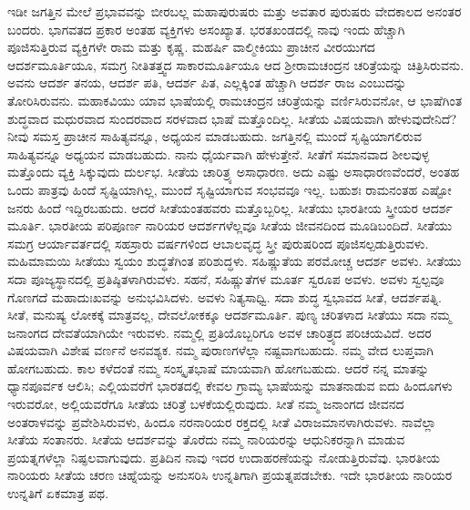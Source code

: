 ಇಡೀ ಜಗತ್ತಿನ ಮೇಲೆ ಪ್ರಭಾವವನ್ನು ಬೀರಬಲ್ಲ ಮಹಾಪುರುಷರು ಮತ್ತು ಅವತಾರ ಪುರುಷರು ವೇದಕಾಲದ ಅನಂತರ ಬಂದರು. ಭಾಗವತದ ಪ್ರಕಾರ ಅಂತಹ ವ್ಯಕ್ತಿಗಳು ಅಸಂಖ್ಯಾತ. ಭರತಖಂಡದಲ್ಲಿ ನಾವು ಇಂದು ಹೆಚ್ಚಾಗಿ ಪೂಜಿಸುತ್ತಿರುವ ವ್ಯಕ್ತಿಗಳೇ ರಾಮ ಮತ್ತು ಕೃಷ್ಣ. ಮಹರ್ಷಿ ವಾಲ್ಮೀಕಿಯು ಪ್ರಾಚೀನ ವೀರಯುಗದ ಆದರ್ಶಮೂರ್ತಿಯೂ, ಸಮಗ್ರ ನೀತಿತತ್ತ್ವದ ಸಾಕಾರಮೂರ್ತಿಯೂ ಆದ ಶ‍್ರೀರಾಮಚಂದ್ರನ ಚರಿತ್ರೆಯನ್ನು ಚಿತ್ರಿಸಿರುವನು. ಅವನು ಆದರ್ಶ ತನಯ, ಆದರ್ಶ ಪತಿ, ಆದರ್ಶ ಪಿತ, ಎಲ್ಲಕ್ಕಿಂತ ಹೆಚ್ಚಾಗಿ ಆದರ್ಶ ರಾಜ ಎಂಬುದನ್ನು ತೋರಿಸಿರುವನು. ಮಹಾಕವಿಯು ಯಾವ ಭಾಷೆಯಲ್ಲಿ ರಾಮಚಂದ್ರನ ಚರಿತ್ರೆಯನ್ನು ವರ್ಣಿಸಿರುವನೋ, ಆ ಭಾಷೆಗಿಂತ ಶುದ್ಧವಾದ ಮಧುರವಾದ ಸುಂದರವಾದ ಸರಳವಾದ ಭಾಷೆ ಮತ್ತೊಂದಿಲ್ಲ. ಸೀತೆಯ ವಿಷಯವಾಗಿ ಹೇಳುವುದೇನಿದೆ? ನೀವು ಸಮಸ್ತ ಪ್ರಾಚೀನ ಸಾಹಿತ್ಯವನ್ನೂ, ಅಧ್ಯಯನ ಮಾಡಬಹುದು. ಜಗತ್ತಿನಲ್ಲಿ ಮುಂದೆ ಸೃಷ್ಟಿಯಾಗಲಿರುವ ಸಾಹಿತ್ಯವನ್ನೂ ಅಧ್ಯಯನ ಮಾಡಬಹುದು. ನಾನು ಧೈರ್ಯವಾಗಿ ಹೇಳುತ್ತೇನೆ. ಸೀತೆಗೆ ಸಮಾನವಾದ ಶೀಲವುಳ್ಳ ಮತ್ತೊಂದು ವ್ಯಕ್ತಿ ಸಿಕ್ಕುವುದು ದುರ್ಲಭ. ಸೀತೆಯ ಚಾರಿತ್ರ್ಯ ಅಸಾಧಾರಣ. ಅದು ಎಷ್ಟು ಅಸಾಧಾರಣವೆಂದರೆ, ಅಂತಹ ಒಂದು ಪಾತ್ರವು ಹಿಂದೆ ಸೃಷ್ಟಿಯಾಗಿಲ್ಲ, ಮುಂದೆ ಸೃಷ್ಟಿಯಾಗುವ ಸಂಭವವೂ ಇಲ್ಲ. ಬಹುಶಃ ರಾಮನಂತಹ ಎಷ್ಟೋ ಜನರು ಹಿಂದೆ ಇದ್ದಿರಬಹುದು. ಆದರೆ ಸೀತೆಯಂತಹವರು ಮತ್ತೊಬ್ಬರಿಲ್ಲ. ಸೀತೆಯು ಭಾರತೀಯ ಸ್ತ್ರೀಯರ ಆದರ್ಶ ಮೂರ್ತಿ. ಭಾರತೀಯ ಪರಿಪೂರ್ಣ ನಾರಿಯರ ಆದರ್ಶಗಳೆಲ್ಲವೂ ಸೀತೆಯ ಜೀವನದಿಂದ ಮೂಡಿಬಂದಿದೆ. ಸೀತೆಯು ಸಮಗ್ರ ಆರ್ಯಾವರ್ತದಲ್ಲಿ ಸಹಸ್ರಾರು ವರ್ಷಗಳಿಂದ ಆಬಾಲವೃದ್ಧ ಸ್ತ್ರೀ ಪುರುಷರಿಂದ ಪೂಜಿಸಲ್ಪಡುತ್ತಿರುವಳು. ಮಹಿಮಾಮಯಿ ಸೀತೆಯು ಸ್ವಯಂ ಶುದ್ಧತೆಗಿಂತ ಪರಿಶುದ್ಧಳು. ಸಹಿಷ್ಣುತೆಯ ಪರಮೋಚ್ಚ ಆದರ್ಶ ಅವಳು. ಸೀತೆಯು ಸದಾ ಪೂಜ್ಯಸ್ಥಾನದಲ್ಲಿ ಪ್ರತಿಷ್ಠಿತಳಾಗಿರುವಳು. ಸಹನೆ, ಸಹಿಷ್ಣುತೆಗಳ ಮೂರ್ತ ಸ್ವರೂಪ ಅವಳು. ಅವಳು ಸ್ವಲ್ಪವೂ ಗೊಣಗದೆ ಮಹಾದುಃಖವನ್ನು ಅನುಭವಿಸಿದಳು. ಅವಳು ನಿತ್ಯಸಾಧ್ವಿ. ಸದಾ ಶುದ್ಧ ಸ್ವಭಾವದ ಸೀತೆ, ಆದರ್ಶಪತ್ನಿ. ಸೀತೆ, ಮನುಷ್ಯ ಲೋಕಕ್ಕೆ ಮಾತ್ರವಲ್ಲ, ದೇವಲೋಕಕ್ಕೂ ಆದರ್ಶಮೂರ್ತಿ. ಪುಣ್ಯ ಚರಿತಳಾದ ಸೀತೆಯು ಸದಾ ನಮ್ಮ ಜನಾಂಗದ ದೇವತೆಯಾಗಿಯೇ ಇರುವಳು. ನಮ್ಮಲ್ಲಿ ಪ್ರತಿಯೊಬ್ಬರಿಗೂ ಅವಳ ಚಾರಿತ್ರ್ಯದ ಪರಿಚಯವಿದೆ. ಅದರ ವಿಷಯವಾಗಿ ವಿಶೇಷ ವರ್ಣನೆ ಅನವಶ್ಯಕ. ನಮ್ಮ ಪುರಾಣಗಳೆಲ್ಲಾ ನಷ್ಟವಾಗಬಹುದು. ನಮ್ಮ ವೇದ ಲುಪ್ತವಾಗಿ ಹೋಗಬಹುದು. ಕಾಲ ಕಳೆದಂತೆ ನಮ್ಮ ಸಂಸ್ಕೃತಭಾಷೆ ಮಾಯವಾಗಿ ಹೋಗಬಹುದು. ಆದರೆ ನನ್ನ ಮಾತನ್ನು ಧ್ಯಾನಪೂರ್ವಕ ಆಲಿಸಿ; ಎಲ್ಲಿಯವರೆಗೆ ಭಾರತದಲ್ಲಿ ಕೇವಲ ಗ್ರಾಮ್ಯ ಭಾಷೆಯನ್ನು ಮಾತನಾಡುವ ಐದು ಹಿಂದೂಗಳು ಇರುವರೋ, ಅಲ್ಲಿಯವರೆಗೂ ಸೀತೆಯ ಚರಿತ್ರೆ ಬಳಕೆಯಲ್ಲಿರುವುದು. ಸೀತೆ ನಮ್ಮ ಜನಾಂಗದ ಜೀವನದ ಅಂತರಾಳವನ್ನು ಪ್ರವೇಶಿಸಿರುವಳು, ಹಿಂದೂ ನರನಾರಿಯರ ರಕ್ತದಲ್ಲಿ ಸೀತೆ ವಿರಾಜಮಾನಳಾಗಿರುವಳು. ನಾವೆಲ್ಲಾ ಸೀತೆಯ ಸಂತಾನರು. ಸೀತೆಯ ಆದರ್ಶವನ್ನು ತೊರೆದು ನಮ್ಮ ನಾರಿಯರನ್ನು ಆಧುನಿಕರನ್ನಾಗಿ ಮಾಡುವ ಪ್ರಯತ್ನಗಳೆಲ್ಲಾ ನಿಷ್ಫಲವಾಗುವುದು. ಪ್ರತಿದಿನ ನಾವು ಇದರ ಉದಾಹರಣೆಯನ್ನು ನೋಡುತ್ತಿರುವೆವು. ಭಾರತೀಯ ನಾರಿಯರು ಸೀತೆಯ ಚರಣ ಚಿಹ್ನೆಯನ್ನು ಅನುಸರಿಸಿ ಉನ್ನತಿಗಾಗಿ ಪ್ರಯತ್ನಪಡಬೇಕು. ಇದೇ ಭಾರತೀಯ ನಾರಿಯರ ಉನ್ನತಿಗೆ ಏಕಮಾತ್ರ ಪಥ.

